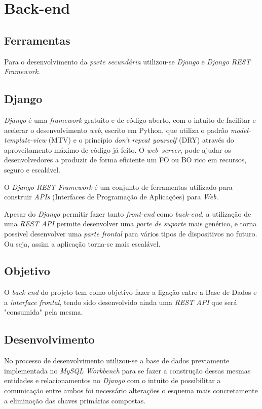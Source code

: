 \documentclass[11pt,a4paper]{report}
\begin{document}
\chapter{Back-end}

\section{Ferramentas}

Para o desenvolvimento da  \emph{parte secundária} utilizou-se \emph{Django} e \emph{Django REST Framework}.

\section{Django}

\emph{Django} é uma \emph{framework} gratuito e de código aberto, com o intuito de facilitar e acelerar o desenvolvimento \emph{web}, escrito em Python, que utiliza o padrão \emph{model-template-view} (MTV) e o princípio \emph{don't repeat yourself} (DRY) através do aproveitamento máximo de código já feito. O \emph{web\ server}, pode ajudar os desenvolvedores a produzir de forma eficiente um FO ou BO rico em recursos, seguro e escalável.

O \emph{Django REST Framework} é um conjunto de ferramentas utilizado para construir \emph{APIs} (Interfaces de Programação de Aplicações) para \emph{Web}.

Apesar do \emph{Django} permitir fazer tanto \emph{front-end} como \emph{back-end}, a utilização de uma \emph{REST API} permite desenvolver uma \emph{parte de suporte} mais genérico, e torna possível desenvolver uma \emph{parte frontal} para vários tipos de dispositivos no futuro. Ou seja, assim a aplicação torna-se mais escalável. 

\section{Objetivo}

O \emph{back-end} do projeto tem como objetivo fazer a ligação entre a Base de Dados e a \emph{interface frontal}, tendo sido desenvolvido ainda uma \emph{REST API} que será "consumida" pela mesma.
\newpage
\section{Desenvolvimento}

No processo de desenvolvimento utilizou-se a base de dados previamente implementada no \emph{MySQL Workbench} para se fazer a construção dessas mesmas entidades e relacionamentos no \emph{Django} com o intuito de possibilitar a comunicação entre ambos foi necessário alterações o esquema mais concretamente a eliminação das chaves primárias compostas.
\end{document}
